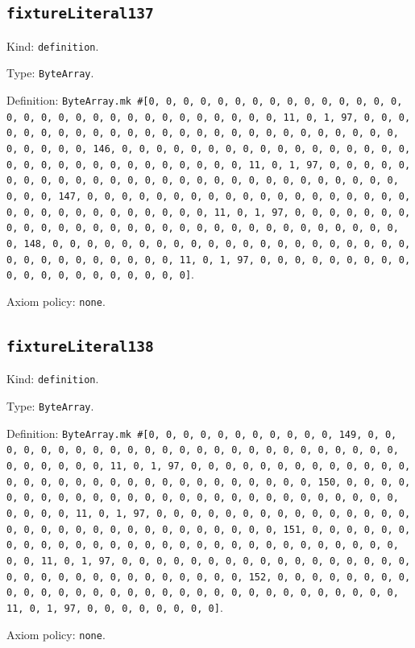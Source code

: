 \documentclass[11pt]{article}
\begin{document}
\subsection*{\texttt{fixtureLiteral137}}
\noindent Kind: \texttt{definition}.\par
\noindent Type: \texttt{ByteArray}.\par
\noindent Definition: \texttt{ByteArray.mk \#[0, 0, 0, 0, 0, 0, 0, 0, 0, 0, 0, 0, 0, 0, 0, 0, 0, 0, 0, 0, 0, 0, 0, 0, 0, 0, 0, 0, 0, 0, 0, 11, 0, 1, 97, 0, 0, 0, 0, 0, 0, 0, 0, 0, 0, 0, 0, 0, 0, 0, 0, 0, 0, 0, 0, 0, 0, 0, 0, 0, 0, 0, 0, 0, 0, 0, 146, 0, 0, 0, 0, 0, 0, 0, 0, 0, 0, 0, 0, 0, 0, 0, 0, 0, 0, 0, 0, 0, 0, 0, 0, 0, 0, 0, 0, 0, 0, 0, 11, 0, 1, 97, 0, 0, 0, 0, 0, 0, 0, 0, 0, 0, 0, 0, 0, 0, 0, 0, 0, 0, 0, 0, 0, 0, 0, 0, 0, 0, 0, 0, 0, 0, 0, 147, 0, 0, 0, 0, 0, 0, 0, 0, 0, 0, 0, 0, 0, 0, 0, 0, 0, 0, 0, 0, 0, 0, 0, 0, 0, 0, 0, 0, 0, 0, 0, 11, 0, 1, 97, 0, 0, 0, 0, 0, 0, 0, 0, 0, 0, 0, 0, 0, 0, 0, 0, 0, 0, 0, 0, 0, 0, 0, 0, 0, 0, 0, 0, 0, 0, 0, 148, 0, 0, 0, 0, 0, 0, 0, 0, 0, 0, 0, 0, 0, 0, 0, 0, 0, 0, 0, 0, 0, 0, 0, 0, 0, 0, 0, 0, 0, 0, 0, 11, 0, 1, 97, 0, 0, 0, 0, 0, 0, 0, 0, 0, 0, 0, 0, 0, 0, 0, 0, 0, 0, 0, 0]}.\par
\noindent Axiom policy: \texttt{none}.\par
\subsection*{\texttt{fixtureLiteral138}}
\noindent Kind: \texttt{definition}.\par
\noindent Type: \texttt{ByteArray}.\par
\noindent Definition: \texttt{ByteArray.mk \#[0, 0, 0, 0, 0, 0, 0, 0, 0, 0, 0, 149, 0, 0, 0, 0, 0, 0, 0, 0, 0, 0, 0, 0, 0, 0, 0, 0, 0, 0, 0, 0, 0, 0, 0, 0, 0, 0, 0, 0, 0, 0, 0, 11, 0, 1, 97, 0, 0, 0, 0, 0, 0, 0, 0, 0, 0, 0, 0, 0, 0, 0, 0, 0, 0, 0, 0, 0, 0, 0, 0, 0, 0, 0, 0, 0, 0, 0, 150, 0, 0, 0, 0, 0, 0, 0, 0, 0, 0, 0, 0, 0, 0, 0, 0, 0, 0, 0, 0, 0, 0, 0, 0, 0, 0, 0, 0, 0, 0, 0, 11, 0, 1, 97, 0, 0, 0, 0, 0, 0, 0, 0, 0, 0, 0, 0, 0, 0, 0, 0, 0, 0, 0, 0, 0, 0, 0, 0, 0, 0, 0, 0, 0, 0, 0, 151, 0, 0, 0, 0, 0, 0, 0, 0, 0, 0, 0, 0, 0, 0, 0, 0, 0, 0, 0, 0, 0, 0, 0, 0, 0, 0, 0, 0, 0, 0, 0, 11, 0, 1, 97, 0, 0, 0, 0, 0, 0, 0, 0, 0, 0, 0, 0, 0, 0, 0, 0, 0, 0, 0, 0, 0, 0, 0, 0, 0, 0, 0, 0, 0, 0, 0, 152, 0, 0, 0, 0, 0, 0, 0, 0, 0, 0, 0, 0, 0, 0, 0, 0, 0, 0, 0, 0, 0, 0, 0, 0, 0, 0, 0, 0, 0, 0, 0, 11, 0, 1, 97, 0, 0, 0, 0, 0, 0, 0, 0]}.\par
\noindent Axiom policy: \texttt{none}.\par
\end{document}
